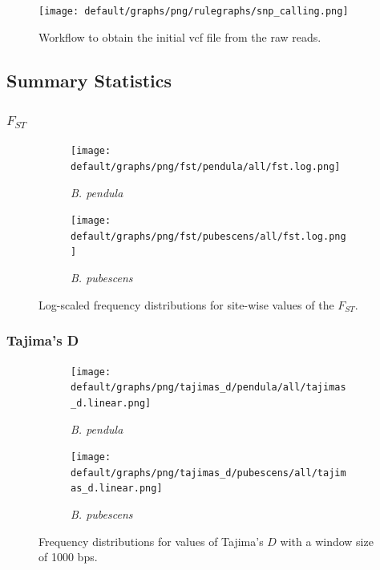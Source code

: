 \documentclass[hidelinks,11pt]{article}
\newcommand{\pendula}{\textit{B. pendula}}
\newcommand{\pubescens}{\textit{B. pubescens}}
\begin{document}
    \begin{figure}[H]
        \centering
        \texttt{[image: default/graphs/png/rulegraphs/snp\_calling.png]}
        \caption{Workflow to obtain the initial \acrshort{vcf} file from the raw reads.}
    \end{figure}

    \clearpage

    \subsection{Summary Statistics}
    \label{sec:basic-stats}

    \subsubsection{$F_{ST}$}

    \begin{figure}[H]
        \centering
        \begin{subfigure}[b]{0.49\textwidth}
            \centering
            \texttt{[image: default/graphs/png/fst/pendula/all/fst.log.png]}
            \caption{\pendula{}}
        \end{subfigure}
        \hfill
        \begin{subfigure}[b]{0.49\textwidth}
            \centering
            \texttt{[image: default/graphs/png/fst/pubescens/all/fst.log.png]}
            \caption{\pubescens{}}
        \end{subfigure}
        \caption{Log-scaled frequency distributions for site-wise values of the $F_{ST}$.}
        \label{fig:fst}
    \end{figure}

    \subsubsection{Tajima's D}

    \begin{figure}[H]
        \centering
        \begin{subfigure}[b]{0.49\textwidth}
            \centering
            \texttt{[image: default/graphs/png/tajimas\_d/pendula/all/tajimas\_d.linear.png]}
            \caption{\pendula{}}
            \label{fig:tajimas_d_pendula}
        \end{subfigure}
        \hfill
        \begin{subfigure}[b]{0.49\textwidth}
            \centering
            \texttt{[image: default/graphs/png/tajimas\_d/pubescens/all/tajimas\_d.linear.png]}
            \caption{\pubescens{}}
            \label{fig:tajimas_d_pubescens}
        \end{subfigure}
        \caption{Frequency distributions for values of Tajima's $D$ with a window size of 1000 bps.}
        \label{fig:tajimas_d}
    \end{figure}
\end{document}
